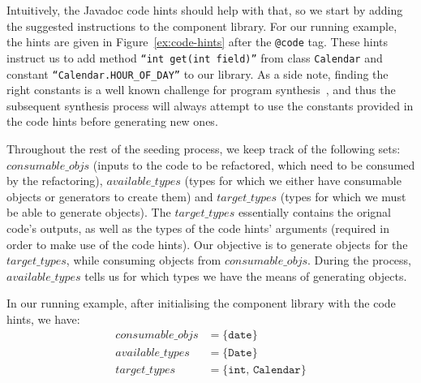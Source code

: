 \documentclass[sigconf,review,anonymous]{acmart}
\begin{document}

Intuitively, the Javadoc code hints should help with that, so we start by adding the
suggested instructions to the component library.
For our running example, the hints are given in Figure~\ref{ex:code-hints} after the
\texttt{@code} tag.
These hints instruct us to add method \texttt{``int get(int field)''} from class
\texttt{Calendar} and constant \texttt{``Calendar.HOUR\_OF\_DAY''} to our library.
As a side note, finding the right constants is a well known
challenge for program synthesis~\cite{DBLP:conf/cav/AbateDKKP18}, and thus the subsequent
synthesis process will always attempt to use the constants provided in the code hints before generating new ones.

Throughout the rest of the seeding process, we keep track of the following sets:
$consumable\_ objs$ (inputs to the code to be refactored, which need to be consumed by the refactoring),  
$available\_types$ (types for which we either have consumable objects or generators to create them) and 
$target\_types$ (types for which we must be able to generate objects). The $target\_types$
essentially contains the orignal code's outputs, as well as the types of the code hints' arguments (required in order to make use of the code hints).
Our objective is to generate objects for the $target\_types$, while consuming objects from $consumable\_objs$.
During the process, $available\_types$ tells us for which types we have the means
of generating objects.


In our running example, after initialising the component library with the code hints, we have:
\[
\begin{aligned}
  consumable\_objs &=  \{\texttt{date}\}\\  
  available\_types &=  \{\texttt{Date}\}\\
  target\_types &= \{\texttt{int, Calendar}\}
\end{aligned}
\]

%
\end{document}
